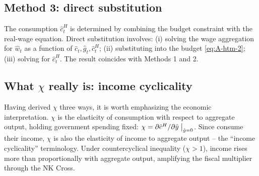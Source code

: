 \subsection{Method 3: direct substitution}\label{app:method-3}
The \HtM{} consumption $\hat c^{H}_{t}$ is determined by combining the \HtM{}
budget constraint with the real-wage equation. Direct substitution involves:
(i) solving the wage aggregation for $\hat w_{t}$ as a function of
$\hat c_{t},\hat g_{t},\hat c^{H}_{t}$; (ii) substituting into the \HtM{}
budget \eqref{eq:A-htm-2}; (iii) solving for $\hat c^{H}_{t}$. The result
coincides with Methods 1 and 2.

\subsection{What $\chi$ really is: income cyclicality}\label{app:chi-meaning}
Having derived $\chi$ three ways, it is worth emphasizing the economic
interpretation. $\chi$ is the elasticity of \HtM{} consumption with respect to
aggregate output, holding government spending fixed:
$\chi=\partial\hat c^{H}/\partial\hat y\bigm|_{\hat g=0}$. Since \HtM{} consume
their income, $\chi$ is also the elasticity of \HtM{} income to aggregate
output -- the ``income cyclicality'' terminology. Under countercyclical
inequality ($\chi>1$), \HtM{} income rises more than proportionally with
aggregate output, amplifying the fiscal multiplier through the NK Cross.
